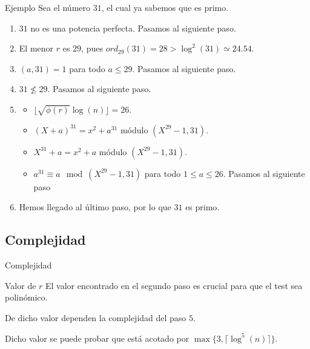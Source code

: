 \documentclass{beamer}
\begin{document}
\begin{frame}{Ejemplo}
	Sea el número $31$, el cual ya sabemos que es primo.
	
	\begin{enumerate}[<+(1)->]
		\item $31$ no es una potencia perfecta. Pasamos al siguiente paso.
		
		\item El menor $r$ es $29$, pues $ord_{29}(31) = 28 > \log^2(31) \simeq 24.54$.
		
		\item $(a, 31) = 1$ para todo $a \leq 29$. Pasamos al siguiente paso.
		
		\item $31 \not\leq 29$. Pasamos al siguiente paso.
		
		\item
		
		\begin{itemize}
			\item $\lfloor\sqrt{\phi(r)}\log(n)\rfloor = 26$.
			
			\item $(X + a)^{31} = x^2 + a^{31}$ módulo $(X^{29}-1, 31)$.
			
			\item $X^{31} + a = x^2 + a$ módulo $(X^{29}-1, 31)$.
			
			\item $a^{31} \equiv a \mod(X^{29}-1, 31)$ para todo $1 \leq a \leq 26$. Pasamos al siguiente paso
		\end{itemize}
		
		\item Hemos llegado al último paso, por lo que $31$ es primo.
	\end{enumerate}
\end{frame}

\subsection{Complejidad}

\begin{frame}
	\centering
	\begin{Large}
		Complejidad
	\end{Large}
\end{frame}

\begin{frame}{Valor de $r$}
	\onslide<1->El valor encontrado en el segundo paso es crucial para que el test sea polinómico.\break
	
	De dicho valor dependen la complejidad del paso $5$.\break
	
	Dicho valor se puede probar que está acotado por $\max\{3, \lceil\log^5(n)\rceil\}$.
\end{frame}
\end{document}
